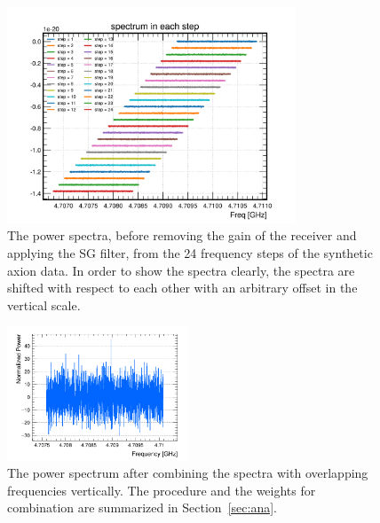 \begin{figure}[htbp]                                                                                                  
    \centering                                                                                                                       
    \includegraphics[width=8.6cm]{figures/faxion_rawpower_24steps.png}
 \caption{The power spectra, before removing the gain of the receiver and applying the 
 SG filter, from the 24 frequency steps of the synthetic axion 
data. In order to show the spectra clearly, the spectra are shifted 
with respect to each other with an arbitrary offset in the vertical scale.}                
\label{fig:faxionstep}                                                                                                            
\end{figure}                       

\begin{figure}[htbp]                                                                                                  
    \centering                                                                                                                       
    \includegraphics[width=0.48\textwidth]{figures/Power_CombSpectrum_FaxionRun_AllSteps_Rescan_SG4_W201_LqWeight.png}
    \caption{The power spectrum after combining the spectra with overlapping 
frequencies vertically. The procedure and the weights for combination 
are summarized in Section~\ref{sec:ana}.}                
\label{fig:faxioncombine}                                                                                                            
\end{figure}                       


